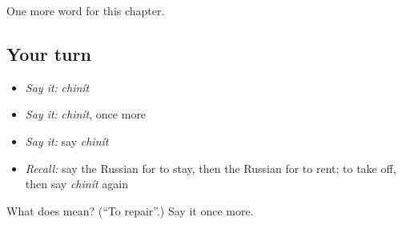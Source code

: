 \begin{grammarlens}[title={What you've built}]
One more word for this chapter.
\end{grammarlens}

\subsection*{Your turn}
\begin{itemize}
\raggedright
  \item \emph{Say it:} \emph{chinít}
  \item \emph{Say it:} \emph{chinít}, once more
  \item \emph{Say it:} say \emph{chinít}
  \item \emph{Recall:} say the Russian for to stay, then the Russian for to rent; to take off, then say \emph{chinít} again
\end{itemize}

\begin{tcolorbox}[breakable,colback=teal!4,colframe=teal!35!black,title={Before you move on}]
What does  mean? (\textquotedblleft{}To repair\textquotedblright{}.) Say it once more.
\end{tcolorbox}
